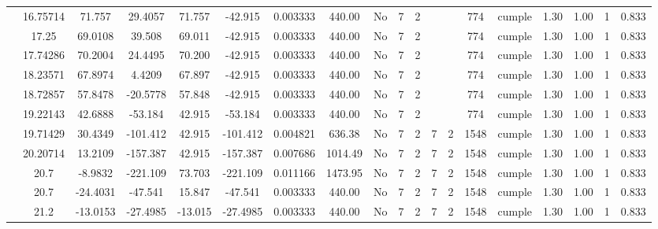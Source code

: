 \begin{table}[H]
{\begin{tabular}{|c|c|c|c|c|c|r|c|c|c|c|c|c|c|c|c|c|c|c|}
\cline{2-19}        & 16.75714 & 71.757 & 29.4057 & 71.757 & -42.915 & 0.003333 & 440.00 & No  & 7   & 2   &     &     & 774 & \cellcolor[rgb]{ .776,  .937,  .808}cumple & 1.30 & 1.00 & 1   & 0.833 \bigstrut\\
\cline{2-19}        & 17.25 & 69.0108 & 39.508 & 69.011 & -42.915 & 0.003333 & 440.00 & No  & 7   & 2   &     &     & 774 & \cellcolor[rgb]{ .776,  .937,  .808}cumple & 1.30 & 1.00 & 1   & 0.833 \bigstrut\\
\cline{2-19}        & 17.74286 & 70.2004 & 24.4495 & 70.200 & -42.915 & 0.003333 & 440.00 & No  & 7   & 2   &     &     & 774 & \cellcolor[rgb]{ .776,  .937,  .808}cumple & 1.30 & 1.00 & 1   & 0.833 \bigstrut\\
\cline{2-19}        & 18.23571 & 67.8974 & 4.4209 & 67.897 & -42.915 & 0.003333 & 440.00 & No  & 7   & 2   &     &     & 774 & \cellcolor[rgb]{ .776,  .937,  .808}cumple & 1.30 & 1.00 & 1   & 0.833 \bigstrut\\
\cline{2-19}        & 18.72857 & 57.8478 & -20.5778 & 57.848 & -42.915 & 0.003333 & 440.00 & No  & 7   & 2   &     &     & 774 & \cellcolor[rgb]{ .776,  .937,  .808}cumple & 1.30 & 1.00 & 1   & 0.833 \bigstrut\\
\cline{2-19}        & 19.22143 & 42.6888 & -53.184 & 42.915 & -53.184 & 0.003333 & 440.00 & No  & 7   & 2   &     &     & 774 & \cellcolor[rgb]{ .776,  .937,  .808}cumple & 1.30 & 1.00 & 1   & 0.833 \bigstrut\\
\cline{2-19}        & 19.71429 & 30.4349 & -101.412 & 42.915 & -101.412 & 0.004821 & 636.38 & No  & 7   & 2   & 7   & 2   & 1548 & \cellcolor[rgb]{ .776,  .937,  .808}cumple & 1.30 & 1.00 & 1   & 0.833 \bigstrut\\
\cline{2-19}        & 20.20714 & 13.2109 & -157.387 & 42.915 & -157.387 & 0.007686 & 1014.49 & No  & 7   & 2   & 7   & 2   & 1548 & \cellcolor[rgb]{ .776,  .937,  .808}cumple & 1.30 & 1.00 & 1   & 0.833 \bigstrut\\
\cline{2-19}        & \cellcolor[rgb]{ .851,  .882,  .949}20.7 & -8.9832 & -221.109 & 73.703 & -221.109 & 0.011166 & 1473.95 & No  & 7   & 2   & 7   & 2   & 1548 & \cellcolor[rgb]{ .776,  .937,  .808}cumple & 1.30 & 1.00 & 1   & 0.833 \bigstrut\\
\cline{2-19}        & \cellcolor[rgb]{ .851,  .882,  .949}20.7 & -24.4031 & -47.541 & 15.847 & -47.541 & 0.003333 & 440.00 & No  & 7   & 2   & 7   & 2   & 1548 & \cellcolor[rgb]{ .776,  .937,  .808}cumple & 1.30 & 1.00 & 1   & 0.833 \bigstrut\\
\cline{2-19}        & 21.2 & -13.0153 & -27.4985 & -13.015 & -27.4985 & 0.003333 & 440.00 & No  & 7   & 2   & 7   & 2   & 1548 & \cellcolor[rgb]{ .776,  .937,  .808}cumple & 1.30 & 1.00 & 1   & 0.833 \bigstrut\\

\end{tabular}}
\end{table}
